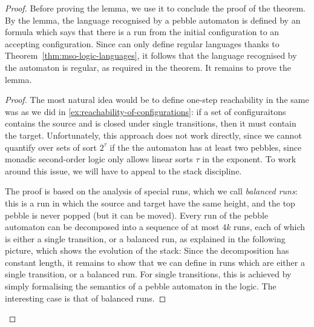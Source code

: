\begin{proof}
    Before proving the lemma, we use it to conclude the proof of the theorem. By the lemma, the language recognised by a pebble automaton  is defined by an \mso formula which  says that there is a run from the initial configuration to an accepting configuration. Since  \mso can only define regular languages thanks to Theorem~\ref{thm:mso-logic-languages}, it follows that the language recognised by the automaton is regular, as required in the theorem. It remains to prove the lemma.






    \begin{proof}
        The most natural idea would be to define one-step reachability in the same was as we did in \cref{ex:reachability-of-configurations}: if a set of configuraitons contains the source and is closed under single transitions, then it must contain the target. 
        Unfortunately, this approach does not work directly, since we cannot quantify over sets of sort $2^\tau$ if the the automaton has at least two pebbles, since  monadic second-order logic only allows linear sorts $\tau$ in the exponent. To work around this issue, we will have to appeal to the stack discipline. 
        
        The proof is based on the analysis of special runs, which we call \emph{balanced runs}: this is a run in which the source and target have the same height, and the top pebble is never popped (but it can be moved).  Every run of the pebble automaton can be decomposed into a sequence of at most $4k$ runs, each of which is either a single transition, or a balanced run, as explained in the following picture, which shows the evolution of the stack:
    Since the decomposition has constant length, it remains to show that we can define in \mso runs which are either a single transition, or a balanced run. For single transitions, this is achieved by simply formalising the semantics of a pebble automaton in the logic. The interesting case is that of balanced runs. 


\end{proof}
\end{proof}
